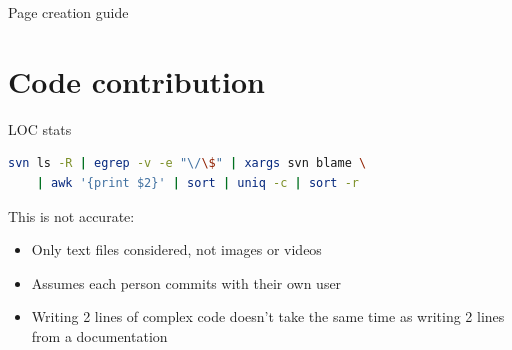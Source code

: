 \documentclass[10pt]{beamer}
\begin{document}
\begin{frame}{Page creation guide}
\vfill{}\vfill
\end{frame}

\section{Code contribution}

\begin{frame}[fragile]{LOC stats}
\begin{lstlisting}[language=bash]
svn ls -R | egrep -v -e "\/\$" | xargs svn blame \
    | awk '{print $2}' | sort | uniq -c | sort -r
\end{lstlisting}
\vfill
This is not accurate:
\begin{itemize}
\item Only text files considered, not images or videos
\item Assumes each person commits with their own user
\item Writing 2 lines of complex code doesn't take the same time as writing 2 lines from a documentation
\end{itemize}
\end{frame}
\end{document}
